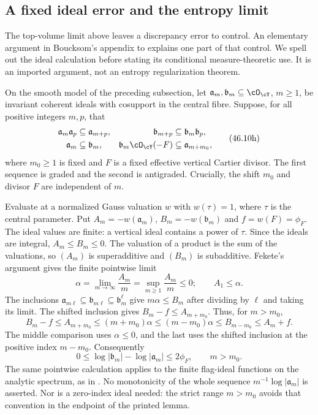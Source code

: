 \subsection{A fixed ideal error and the entropy limit}
\label{sec:ch46-fixed-ideal-error}

The top-volume limit above leaves a discrepancy error to control.
An elementary argument in Boucksom's appendix to
\cite[Lemma~A.7]{Trusiani26} explains one part of that control.
We spell out the ideal calculation before stating its conditional
measure-theoretic use. It is an imported argument, not an entropy
regularization theorem.

On the smooth model of the preceding subsection, let
$\mathfrak a_m,\mathfrak b_m\subseteq\cO_{\cY}$, $m\geq1$, be
invariant coherent ideals with cosupport in the central fibre. Suppose,
for all positive integers $m,p$, that
\[
 \begin{aligned}
 \mathfrak a_m\mathfrak a_p&\subseteq\mathfrak a_{m+p},&
 \mathfrak b_{m+p}&\subseteq\mathfrak b_m\mathfrak b_p,\\
 \mathfrak a_m&\subseteq\mathfrak b_m,&
 \mathfrak b_m\cO_{\cY}(-F)&\subseteq\mathfrak a_{m+m_0},
 \end{aligned}
\tag{46.10h}\label{eq:ch46-graded-ideal-inputs}
\]
where $m_0\geq1$ is fixed and $F$ is a fixed effective vertical
Cartier divisor. The first sequence is graded and the second is
antigraded. Crucially, the shift $m_0$ and divisor $F$ are independent
of $m$.

Evaluate at a normalized Gauss valuation $w$ with $w(\tau)=1$,
where $\tau$ is the central parameter. Put
$A_m=-w(\mathfrak a_m)$, $B_m=-w(\mathfrak b_m)$ and
$f=w(F)=\phi_F$. The ideal values are finite: a vertical ideal
contains a power of $\tau$. Since the ideals are integral,
$A_m\leq B_m\leq0$. The valuation of a product is the sum of
the valuations, so $(A_m)$ is superadditive and $(B_m)$ is
subadditive. Fekete's argument gives the finite pointwise limit
\[
 \alpha=\lim_{m\to\infty}\frac{A_m}{m}
        =\sup_{m\geq1}\frac{A_m}{m}\leq0;
 \qquad A_1\leq\alpha.
\]
The inclusions
$\mathfrak a_{m\ell}\subseteq\mathfrak b_{m\ell}
 \subseteq\mathfrak b_m^{\ell}$ give
$m\alpha\leq B_m$ after dividing by $\ell$ and taking its limit.
The shifted inclusion gives $B_m-f\leq A_{m+m_0}$.
Thus, for $m>m_0$,
\[
 B_m-f\leq A_{m+m_0}\leq(m+m_0)\alpha
 \leq(m-m_0)\alpha\leq B_{m-m_0}\leq A_m+f.
\]
The middle comparison uses $\alpha\leq0$, and the last uses the
shifted inclusion at the positive index $m-m_0$. Consequently
\[
 0\leq\log|\mathfrak b_m|-\log|\mathfrak a_m|
       \leq2\phi_F,\qquad m>m_0.
\tag{46.10i}\label{eq:ch46-fixed-ideal-error}
\]
The same pointwise calculation applies to the finite flag-ideal
functions on the analytic spectrum, as in
. No monotonicity of the whole sequence
$m^{-1}\log|\mathfrak a_m|$ is asserted. Nor is a zero-index ideal
needed: the strict range $m>m_0$ avoids that convention in the
endpoint of the printed lemma.

